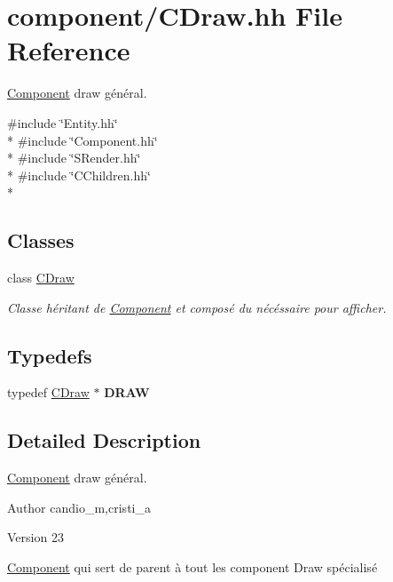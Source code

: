 \hypertarget{_c_draw_8hh}{}\section{component/\+C\+Draw.hh File Reference}
\label{_c_draw_8hh}


\hyperlink{class_component}{Component} draw général.  


{\ttfamily \#include \char`\"{}Entity.\+hh\char`\"{}}\\*
{\ttfamily \#include \char`\"{}Component.\+hh\char`\"{}}\\*
{\ttfamily \#include \char`\"{}S\+Render.\+hh\char`\"{}}\\*
{\ttfamily \#include \char`\"{}C\+Children.\+hh\char`\"{}}\\*
\subsection*{Classes}
\begin{DoxyCompactItemize}
\item 
class \hyperlink{class_c_draw}{C\+Draw}
\begin{DoxyCompactList}\small\item\em Classe héritant de \hyperlink{class_component}{Component} et composé du nécéssaire pour afficher. \end{DoxyCompactList}\end{DoxyCompactItemize}
\subsection*{Typedefs}
\begin{DoxyCompactItemize}
\item 
\hypertarget{_c_draw_8hh_a7aa6a09c7629a49caa0bbed82a942367}{}typedef \hyperlink{class_c_draw}{C\+Draw} $\ast$ {\bfseries D\+R\+A\+W}\label{_c_draw_8hh_a7aa6a09c7629a49caa0bbed82a942367}

\end{DoxyCompactItemize}


\subsection{Detailed Description}
\hyperlink{class_component}{Component} draw général. 

\begin{DoxyAuthor}{Author}
candio\+\_\+m,cristi\+\_\+a 
\end{DoxyAuthor}
\begin{DoxyVersion}{Version}
23
\end{DoxyVersion}
\hyperlink{class_component}{Component} qui sert de parent à tout les component Draw spécialisé 
